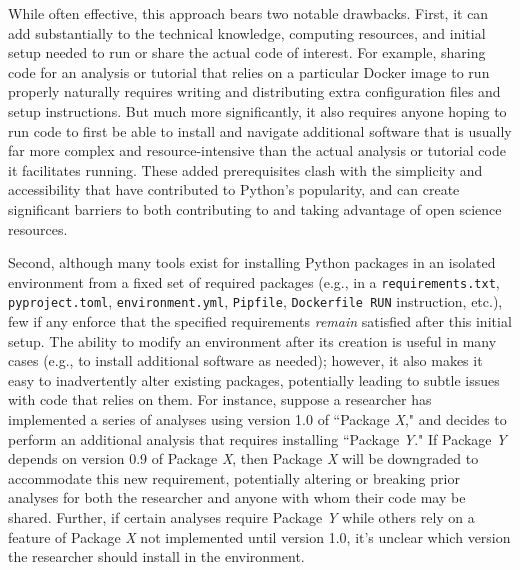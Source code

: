 \documentclass[preprint,12pt, a4paper]{elsarticle}
\begin{document}
While often effective, this approach bears two notable drawbacks.
First, it can add substantially to the technical knowledge, computing resources, and initial setup needed to run or share the actual code of interest.
For example, sharing code for an analysis or tutorial that relies on a particular Docker image to run properly naturally requires writing and distributing extra configuration files and setup instructions.
But much more significantly, it also requires anyone hoping to run code to first be able to install and navigate additional software that is usually far more complex and resource-intensive than the actual analysis or tutorial code it facilitates running.
These added prerequisites clash with the simplicity and accessibility that have contributed to Python's popularity, and can create significant barriers to both contributing to and taking advantage of open science resources.


Second, although many tools exist for installing Python packages in an isolated environment from a fixed set of required packages (e.g., in a \texttt{requirements.txt}, \texttt{pyproject.toml}, \texttt{environment.yml}, \texttt{Pipfile}, \texttt{Dockerfile RUN} instruction, etc.), few if any enforce that the specified requirements \textit{remain} satisfied after this initial setup.
The ability to modify an environment after its creation is useful in many cases (e.g., to install additional software as needed); however, it also makes it easy to inadvertently alter existing packages, potentially leading to subtle issues with code that relies on them.
For instance, suppose a researcher has implemented a series of analyses using version 1.0 of ``Package \textit{X}," and decides to  perform an additional analysis that requires installing ``Package \textit{Y}."
If Package \textit{Y} depends on version 0.9 of Package \textit{X}, then Package \textit{X} will be downgraded to accommodate this new requirement, potentially altering or breaking prior analyses for both the researcher and anyone with whom their code may be shared.
Further, if certain analyses require Package \textit{Y} while others rely on a feature of Package \textit{X} not implemented until version 1.0, it's unclear which version the researcher should install in the environment.
\end{document}
